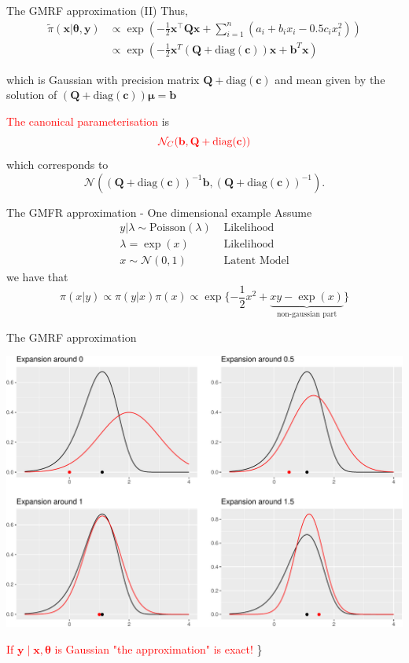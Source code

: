\documentclass[
  ignorenonframetext,
]{beamer}
\begin{document}
\begin{frame}{The GMRF approximation (II)}
\protect\hypertarget{the-gmrf-approximation-ii}{}
Thus, \[
\begin{aligned}
        \widetilde{\pi}(\mathbf{x}|\mathbf{\theta}, \mathbf{y}) &\propto
            \exp\left(-\frac{1}{2}\mathbf{x}^\top \mathbf{Q}\mathbf{x}  +
            \sum_{i=1}^n (a_i + b_i x_i - 0.5 c_i x_i^2)\right)\\
        &{\propto \exp\left(-\frac{1}{2}\mathbf{x}^T(\mathbf{Q} + \text{diag}(\mathbf{c})) \mathbf{x} + \mathbf{b}^T\mathbf{x}\right)}
\end{aligned}
\]

which is Gaussian with precision matrix
\(\mathbf{Q} + \text{diag}(\mathbf{c})\) and mean given by the solution
of \((\mathbf{Q} + \text{diag}(\mathbf{c}))\mathbf{\mu} = \mathbf{b}\)

\textcolor{red}{The canonical parameterisation} is \[
\textcolor{red}{\mathcal{N}_C(\mathbf{b}, \mathbf{Q} + \text{diag}(\mathbf{c}))}
\] which corresponds to \[
\mathcal{N}((\mathbf{Q} + \text{diag}(\mathbf{c}))^{-1}\mathbf{b}, (\mathbf{Q} + \text{diag}(\mathbf{c}))^{-1}).
\]
\end{frame}

\begin{frame}{The GMFR approximation - One dimensional example}
\protect\hypertarget{the-gmfr-approximation---one-dimensional-example}{}
Assume \[
\begin{aligned}
  y|\lambda \sim\text{Poisson}(\lambda)  & \text{ Likelihood}\\
  \lambda = \exp(x)  & \text{ Likelihood}\\
  x\sim\mathcal{N}(0,1) & \text{ Latent Model}
\end{aligned}
\] we have that \[
  \pi(x|y)\propto\pi(y|x)\pi(x)\propto\exp\{ -\frac{1}{2}x^2+
  \underbrace{xy-\exp(x)}_{\text{non-gaussian part}}
  \}
\]
\end{frame}

\begin{frame}{The GMRF approximation}
\protect\hypertarget{the-gmrf-approximation}{}
\begin{center}\includegraphics[width=0.6\linewidth]{Part2_deterministic_files/figure-beamer/unnamed-chunk-8-1} \end{center}

\textcolor{red}{If $\mathbf{y} \mid \mathbf{x}, \mathbf{\theta}$ is Gaussian "the approximation" is exact!}
\}
\end{frame}
\end{document}
